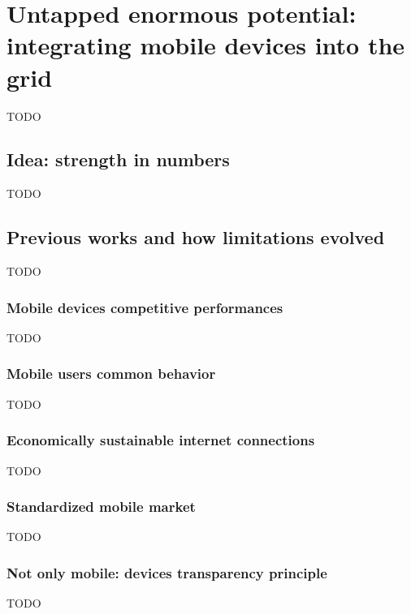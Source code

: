 \section{Untapped enormous potential: integrating mobile devices into the grid}
TODO

\subsection{Idea: strength in numbers}
TODO

\subsection{Previous works and how limitations evolved}
TODO

\subsubsection{Mobile devices competitive performances}
TODO

\subsubsection{Mobile users common behavior}
TODO

\subsubsection{Economically sustainable internet connections}
TODO

\subsubsection{Standardized mobile market}
TODO

\subsubsection{Not only mobile: devices transparency principle}
TODO
